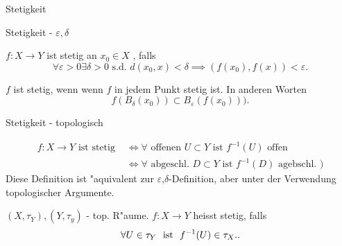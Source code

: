 \documentclass[class=article, crop=false]{standalone}
\begin{document}
\begin{zettel}{Stetigkeit}
\begin{flashcard}

\begin{question}
    Stetigkeit - $\varepsilon, \delta $ 
\end{question}

\begin{definition}[Stetigkeit]
    $f:X \longrightarrow Y$ ist stetig an $x_0 \in  X$ , falls
\[
    \forall \varepsilon >  0 \exists  \delta  > 0 \text{ s.d. }  d (x_0 , x) < \delta \implies (f (x_0), f (x)) <  \varepsilon
.\]

    $f$ ist stetig, wenn wenn $f$ in jedem Punkt stetig ist.
    In anderen Worten
\[
    f (B_{\delta }(x_0)) \subset B_{\varepsilon } (f (x_0)) )
.\]
\end{definition}
\end{flashcard}
\begin{question}
    Stetigkeit - topologisch
\end{question}
\begin{definition}[Stetigkeit]
\begin{align*}
    f:X \longrightarrow Y \text{ ist stetig }  &\iff \forall \text{ offenen } U \subset Y \text{ ist } f^{-1} (U) \text{ offen } \\
                                               &\iff \forall  \text{ abgeschl. } D \subset Y \text{ ist } f^{-1} (D) \text{ agebschl. } )
\end{align*}
    Diese Definition ist "aquivalent zur $\varepsilon $,$\delta$-Definition, aber unter der Verwendung topologischer Argumente.
\end{definition}

\begin{definition}[Stetigkeit]
   $(X, \tau_Y), (Y, \tau_y)$  - top. R"aume. $f:X \longrightarrow Y$ heisst stetig, falls
   \[
       \forall U \in  \tau_Y \tx{ ist } f^{-1} (U) \in  \tau_X.
   .\]
\end{definition}

\end{zettel}
\end{document}
